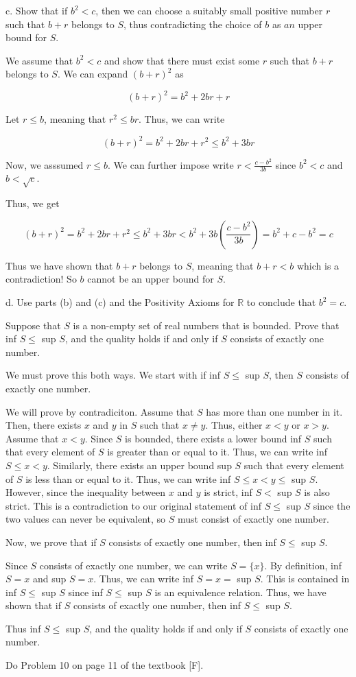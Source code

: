 \documentclass[addpoints]{exam}
\begin{document}
\begin{questions}
c. Show that if $b^2 < c$, then we can choose a suitably small positive number $r$ such that $b + r$ belongs 
to $S$, thus contradicting the choice of $b$ as $an$ upper bound for $S$.

We assume that $b^2 < c$ and show that there must exist some $r$ such that $b + r$ belongs to $S$. We can expand $(b + r)^2$ as 

\[(b + r)^2 = b^2 + 2br + r\]

Let $r \leq b$, meaning that $r^2 \leq br$. Thus, we can write

\[(b + r)^2 = b^2 + 2br + r^2 \leq b^2 + 3br\]

Now, we asssumed $r \leq b$. We can further impose write $r < \frac{c - b^2}{3b}$ since $b^2 < c$ and $b < \sqrt{c}$. 

Thus, we get 

\[(b + r)^2 = b^2 + 2br + r^2 \leq b^2 + 3br < b^2 + 3b(\frac{c - b^2}{3b}) = b^2 + c - b^2 = c\]

Thus we have shown that $b + r$ belongs to $S$, meaning that $b + r < b$ which is a contradiction! So $b$ cannot be an upper bound for $S$.

d. Use parts (b) and (c) and the Positivity Axioms for $\mathbb{R}$ to conclude that $b^2 = c$. 

\question Suppose that $S$ is a non-empty set of real numbers that is bounded. Prove
that inf $S \leq$ sup $S$, and the quality holds if and only if $S$ consists of exactly
one number.

We must prove this both ways. We start with if inf $S \leq$ sup $S$, then $S$ consists of exactly one number.

We will prove by contradiciton. Assume that $S$ has more than one number in it. Then, there exists $x$ and $y$ 
in $S$ such that $x \neq y$. Thus, either $x < y$ or $x > y$. Assume that $x < y$. Since $S$ is bounded, there exists a lower bound 
inf $S$ such that every element of $S$ is greater than or equal to it. Thus, we can write inf $S \leq x < y$. 
Similarly, there exists an upper bound sup $S$ such that every element of $S$ is less than or equal to it. 
Thus, we can write inf $S \leq x < y \leq$ sup $S$. However, since the inequality between $x$ and $y$ is strict, 
inf $S <$ sup $S$ is also strict. This is a contradiction to our original statement of inf $S \leq$ sup $S$ since the
two values can never be equivalent, so $S$ must consist of exactly one number.

Now, we prove that if $S$ consists of exactly one number, then inf $S \leq$ sup $S$.

Since $S$ consists of exactly one number, we can write $S = \{x\}$. By definition, inf $S = x$ and sup $S = x$.
Thus, we can write inf $S = x =$ sup $S$. This is contained in inf $S \leq$ sup $S$ since inf $S \leq$ sup $S$ 
is an equivalence relation. Thus, we have shown that if $S$ consists of exactly one number, then inf $S \leq$ sup $S$.

Thus inf $S \leq$ sup $S$, and the quality holds if and only if $S$ consists of exactly one number.


\question Do Problem 10 on page 11 of the textbook [F].

\end{questions}
\end{document}
